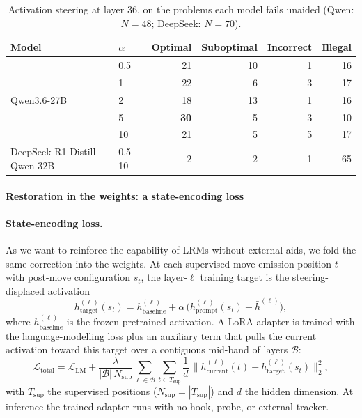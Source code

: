 \documentclass{article} %
\begin{document}
\begin{table}[t]
  \centering
  \caption{Activation steering at layer 36, on the problems each model fails unaided (Qwen: $N{=}48$; DeepSeek: $N{=}70$).}
  \label{tab:steering}
  \setlength{\tabcolsep}{5pt}
  \begin{tabular}{llrrrr}
    \toprule
    \textbf{Model} & \textbf{$\alpha$} & \textbf{Optimal} & \textbf{Suboptimal} & \textbf{Incorrect} & \textbf{Illegal} \\
    \midrule
    \multirow{5}{*}{Qwen3.6-27B} & 0.5 & 21 & 10 & 1 & 16 \\
    & 1  & 22 & 6  & 3 & 17 \\
    & 2  & 18 & 13 & 1 & 16 \\
    & 5  & \textbf{30} & 5  & 3 & 10 \\
    & 10 & 21 & 5  & 5 & 17 \\
    \midrule
    DeepSeek-R1-Distill-Qwen-32B & 0.5--10 & 2 & 2 & 1 & 65 \\
    \bottomrule
  \end{tabular}
\end{table}

\paragraph{Restoration in the weights: a state-encoding loss}
\label{sec:lrm-finetune}

\paragraph{State-encoding loss.} As we want to reinforce the capability of LRMs without external aids, we fold the same correction into the weights. At each supervised move-emission position $t$ with post-move configuration $s_t$, the layer-$\ell$ training target is the steering-displaced activation
\begin{equation}\label{eq:se-target}
  h^{(\ell)}_{\text{target}}(s_t) = h^{(\ell)}_{\text{baseline}} + \alpha\,\bigl(h_{\text{prompt}}^{(\ell)}(s_t) - \bar{h}^{(\ell)}\bigr),
\end{equation}
where $h^{(\ell)}_{\text{baseline}}$ is the frozen pretrained activation. A LoRA adapter is trained with the language-modelling loss plus an auxiliary term that pulls the current activation toward this target over a contiguous mid-band of layers $\mathcal{B}$:
\begin{equation}\label{eq:se-loss}
  \mathcal{L}_{\text{total}} = \mathcal{L}_{\text{LM}} + \frac{\lambda}{|\mathcal{B}|\,N_{\text{sup}}} \sum_{\ell \in \mathcal{B}} \sum_{t \in T_{\text{sup}}} \frac{1}{d}\,\bigl\| h^{(\ell)}_{\text{current}}(t) - h^{(\ell)}_{\text{target}}(s_t) \bigr\|_2^2,
\end{equation}
with $T_{\text{sup}}$ the supervised positions ($N_{\text{sup}}=|T_{\text{sup}}|$) and $d$ the hidden dimension. At inference the trained adapter runs with no hook, probe, or external tracker.
\end{document}
